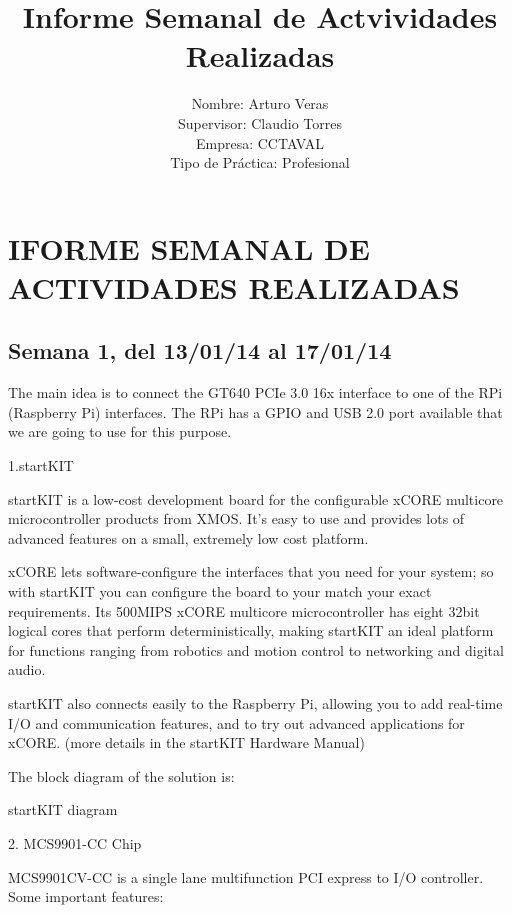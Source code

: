 \documentclass[11pt,twoside]{report}
\begin{document}
\title{\color{red}Informe Semanal de Actvividades Realizadas}
\author{Nombre: Arturo Veras\\ 
Supervisor: Claudio Torres\\
Empresa: CCTAVAL\\
Tipo de Práctica: Profesional}
\maketitle
%
\section*{IFORME SEMANAL DE ACTIVIDADES REALIZADAS}
\subsection*{Semana 1,  del 13/01/14 al 17/01/14}


The main idea is to connect the GT640 PCIe 3.0 16x interface to one of the RPi (Raspberry Pi) interfaces. The RPi has a GPIO and USB 2.0 port available that we are going to use for this purpose.

1.startKIT



startKIT is a low-cost development board for the conﬁgurable xCORE multicore microcontroller products from XMOS. It’s easy to use and provides lots of advanced features on a small, extremely low cost platform.

xCORE lets software-conﬁgure the interfaces that you need for your system; so with startKIT you can conﬁgure the board to your match your exact requirements. Its 500MIPS xCORE multicore microcontroller has eight 32bit logical cores that perform deterministically, making startKIT an ideal platform for functions ranging from robotics and motion control to networking and digital audio.

startKIT also connects easily to the Raspberry Pi, allowing you to add real-time I/O and communication features, and to try out advanced applications for xCORE. (more details in the startKIT Hardware Manual)

The block diagram of the solution is:

startKIT diagram

2. MCS9901-CC Chip

MCS9901CV-CC is a single lane multifunction PCI express to I/O controller. Some important features:
\end{document}
